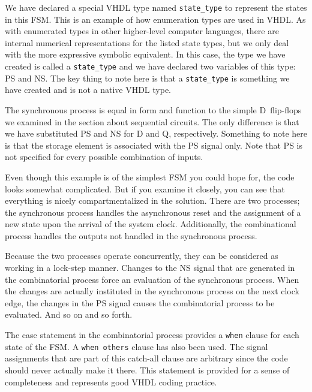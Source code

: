 \begin{my_list}
\item We have declared a special VHDL type named \texttt{state\_type} to represent the states in this FSM. This is an example of how enumeration types are used in VHDL. As with enumerated types in other higher-level computer languages, there are internal numerical representations for the listed state types, but we only deal with the more expressive symbolic equivalent. In this case, the type we have created is called a \texttt{state\_type} and we have declared two variables of this type: PS and NS. The key thing to note here is that a \texttt{state\_type} is something we have created and is not a native VHDL type.

\item The synchronous process is equal in form and function to the simple D~flip-flops we examined in the section about sequential circuits. The only difference is that we have substituted PS and NS for D and Q, respectively. Something to note here is that the storage element is associated with the PS signal only. Note that PS is not specified for every possible combination of inputs. 

\item Even though this example is of the simplest FSM you could hope for, the code looks somewhat complicated. But if you examine it closely, you can see that everything is nicely compartmentalized in the solution. There are two processes; the synchronous process handles the asynchronous reset and the assignment of a new state upon the arrival of the system clock. Additionally, the combinational process handles the outputs not handled in the synchronous process. 

\item Because the two processes operate concurrently, they can be considered as working in a lock-step manner. Changes to the NS signal that are generated in the combinatorial process force an evaluation of the synchronous process. When the changes are actually instituted in the synchronous process on the next clock edge, the changes in the PS signal causes the combinatorial process to be evaluated. And so on and so forth. 

\item The case statement in the combinatorial process provides a \texttt{when} clause for each state of the FSM. A \texttt{when others} clause has also been used. The signal assignments that are part of this catch-all clause are arbitrary since the code should never actually make it there. This statement is provided for a sense of completeness and represents good VHDL coding practice. 


\end{my_list}
